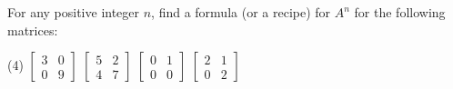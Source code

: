 \documentclass{ximera}
\begin{document}
\begin{exercise}
    For any positive integer $n$, find a formula (or a recipe) for $A^n$ for the following matrices:
    \begin{tasks}(4)
        \task
        $\begin{bmatrix}
            3 & 0 \\ 
            0 & 9
        \end{bmatrix}$
        \task
        $\begin{bmatrix}
            5 & 2 \\ 
            4 & 7
        \end{bmatrix}$
        \task
        $\begin{bmatrix}
            0 & 1 \\ 
            0 & 0
        \end{bmatrix}$
        \task
        $\begin{bmatrix}
            2 & 1 \\ 
            0 & 2
        \end{bmatrix}$
    \end{tasks}
\end{exercise}
\end{document}
